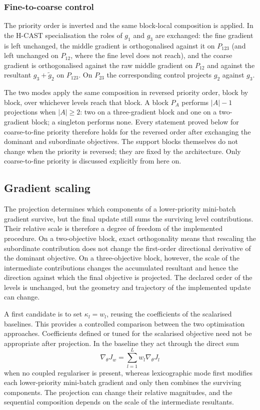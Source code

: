 \subsubsection{Fine-to-coarse control}

The priority order is inverted and the same
block-local composition is applied. In the H-CAST specialisation the roles of $g_1$ and
$g_3$ are exchanged: the fine gradient is left unchanged, the middle
gradient is orthogonalised against it on $P_{123}$ (and left unchanged on
$P_{12}$, where the fine level
does not reach), and the coarse gradient is orthogonalised against the raw middle gradient on
$P_{12}$ and against the resultant $g_3+\tilde g_2$ on $P_{123}$.
On $P_{23}$ the corresponding control projects $g_2$ against $g_3$.

The two modes apply the same composition in reversed priority order, block by
block, over whichever levels reach that block. A block $P_A$ performs
$|A|-1$ projections when $|A|\geq2$: two on a three-gradient block and one on a
two-gradient block; a singleton performs none. Every statement proved below for coarse-to-fine
priority therefore holds for the reversed order after exchanging the dominant
and subordinate objectives. The support blocks themselves do not change when
the priority is reversed; they are fixed by the architecture.
Only coarse-to-fine priority is discussed explicitly from here on.

\subsection{Gradient scaling}
\label{ssec:problem_lr}

The projection determines which components of a lower-priority mini-batch
gradient survive, but the final update still sums the surviving level
contributions. Their relative scale is therefore a degree of freedom of the
implemented procedure. On a two-objective block, exact orthogonality means that
rescaling the subordinate contribution does not change the first-order
directional derivative of the dominant objective. On a three-objective block,
however, the scale of the intermediate contributions changes the accumulated
resultant and hence the direction against which the final objective is
projected. The declared order of the levels is unchanged, but the geometry and
trajectory of the implemented update can change.

A first candidate is to set $\kappa_l=w_l$, reusing the coefficients of the
scalarised baselines. This provides a controlled comparison between the two
optimisation approaches. Coefficients defined or tuned for the scalarised
objective need not be appropriate after projection. In the baseline they act
through the direct sum
\[
\nabla_\theta J_w=\sum_{l=1}^{L}w_l\nabla_\theta J_l
\]
when no coupled regulariser is present, whereas lexicographic mode first
modifies each lower-priority mini-batch gradient and only then combines the
surviving components. The projection can change their relative magnitudes, and
the sequential composition depends on the scale of the intermediate resultants.


